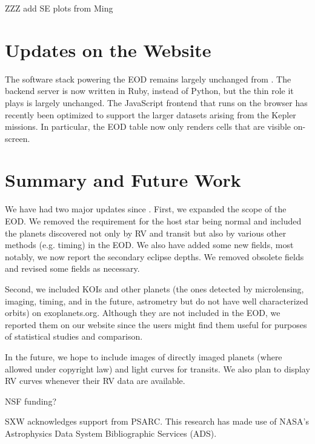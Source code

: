 \documentclass[11pt,preprint]{aastex}
\begin{document}
\begin{CJK*}{UTF8}{gbsn}
ZZZ add SE plots from Ming

\section{Updates on the Website}\label{sec:website}

The software stack powering the EOD remains largely unchanged from
\cite{Wright2011}. The backend server is now written in Ruby, instead
of Python, but the thin role it plays is largely unchanged.  The
JavaScript frontend that runs on the browser has recently been
optimized to support the larger datasets arising from the Kepler
missions.  In particular, the EOD table now only renders cells that
are visible on-screen. 


\section{Summary and Future Work}\label{sec:summary}

We have had two major updates since \cite{Wright2011}. First, we
expanded the scope of the EOD. We removed the requirement for the host
star being normal and included the planets discovered not only by RV
and transit but also by various other methods (e.g. timing) in the
EOD. We also have added some new fields, most notably, we now report
the secondary eclipse depths. We removed obsolete fields and revised
some fields as necessary.

Second, we included KOIs and other planets (the ones detected by
microlensing, imaging, timing, and in the future, astrometry but do not have well characterized orbits) on
exoplanets.org. Although they are not included in the EOD, we reported
them on our website since the users might find them useful for
purposes of statistical studies and comparison.

In the future, we hope to include images of directly imaged planets
(where allowed under copyright law) and light curves for transits. We
also plan to display RV curves whenever their RV data are available.


\acknowledgments

NSF funding?

SXW acknowledges support from PSARC. This research has made use of
NASA's Astrophysics Data System Bibliographic Services (ADS). 



\end{CJK*}
\end{document}
